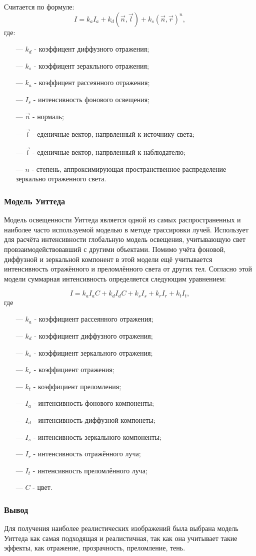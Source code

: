 Считается по формуле:
\[
I = k_{a}I_{a} + k_{d}(\vec{n}, \vec{l}) + k_{s}(\vec{n}, \vec{r})^n,
\]
где:
\begin{itemize}
	\item[---] $k_{d}$ - коэффицент диффузного отражения;
	\item[---] $k_{s}$ - коэффицент зеракльного отражения;
	\item[---] $k_{a}$ - коэффицент рассеянного отражения;
	\item[---] $I_{s}$ - интенсивность фонового освещения;
	\item[---] $\vec{n}$ -  нормаль;
	\item[---] $\vec{l}$ - еденичные вектор, напрвленный к источнику света;
	\item[---] $\vec{l}$ - еденичные вектор, напрвленный к наблюдателю;
	\item[---] $n$ - степень, аппроксимирующая пространственное распределение зеркально отраженного света.
\end{itemize}

\subsubsection{Модель Уиттеда}

Модель освещенности Уиттеда является одной из самых распространенных и наиболее часто используемой моделью в методе трассировки лучей. Использует для расчёта интенсивности глобальную модель освещения, учитывающую свет провзаимодействовавший с другими объектами. Помимо учёта фоновой, диффузной и зеркальной компонент в этой модели ещё учитывается интенсивность отражённого и преломлённого света от других тел. Согласно этой модели суммарная интенсивность определяется следующим уравнением:

\begin{equation}
	I = k_{a}I_{a}C + k_{d}I_{d}C + k_{s}I_{s} + k_{r}I_{r} + k_{t}I_{t},
	\label{eq:whitted_general}
\end{equation}
где 
\begin{itemize}
	\item[---] $k_{a}$ - коэффициент рассеянного отражения;
	\item[---] $k_{d}$ - коэффициент диффузного отражения;
	\item[---] $k_{s}$ - коэффициент зеркального отражения;
	\item[---] $k_{r}$ - коэффициент отражения;
	\item[---] $k_{t}$ - коэффициент преломления;
	\item[---] $I_{a}$ - интенсивность фонового компоненты;
	\item[---] $I_{d}$ - интенсивность диффузной компонеты;
	\item[---] $I_{s}$ - интенсивность зеркального компоненты;
	\item[---] $I_{r}$ - интенсивность отражённого луча;
	\item[---] $I_{t}$ - интенсивность преломлённого луча;
	\item[---] $C$ - цвет.
\end{itemize}

\subsubsection{Вывод}

Для получения наиболее реалистических изображений была выбрана модель Уиттеда как самая подходящая и реалистичная, так как она учитывает такие эффекты, как отражение, прозрачность, преломление, тень.

\pagebreak